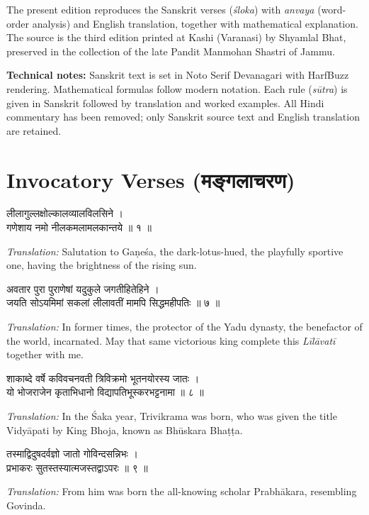 \documentclass[10pt,a4paper]{article}
\newenvironment{sanskritverse}{%
  \begin{center}%
  \begin{minipage}{0.94\textwidth}%
  \centering\devanagarifont\small%
}{%
  \end{minipage}%
  \end{center}%
  \vspace{0.1em}%
}
\begin{document}
The present edition reproduces the Sanskrit verses (\textit{śloka}) with \textit{anvaya} (word-order analysis) and English translation, together with mathematical explanation. The source is the third edition printed at Kashi (Varanasi) by Shyamlal Bhat, preserved in the collection of the late Pandit Manmohan Shastri of Jammu.

\textbf{Technical notes:} Sanskrit text is set in Noto Serif Devanagari with HarfBuzz rendering. Mathematical formulas follow modern notation. Each rule (\textit{sūtra}) is given in Sanskrit followed by translation and worked examples. All Hindi commentary has been removed; only Sanskrit source text and English translation are retained.

\section*{Invocatory Verses (मङ्गलाचरण)}

\begin{sanskritverse}
लीलागुल्लक्षोल्कालव्यालविलसिने ।\\
गणेशाय नमो नीलकमलामलकान्तये ॥ १ ॥
\end{sanskritverse}
\textit{Translation:} Salutation to Gaṇeśa, the dark-lotus-hued, the playfully sportive one, having the brightness of the rising sun.

\begin{sanskritverse}
अवतार पुरा पुराणेषां यदुकुले जगतीहितेहिने ।\\
जयति सोऽयमिमां सकलां लीलावतीं मामपि सिद्धमहीपतिः ॥ ७ ॥
\end{sanskritverse}
\textit{Translation:} In former times, the protector of the Yadu dynasty, the benefactor of the world, incarnated. May that same victorious king complete this \textit{Līlāvatī} together with me.

\begin{sanskritverse}
शाकाब्दे वर्षे कविवचनवती त्रिविक्रमो भूतनयोरस्य जातः ।\\
यो भोजराजेन कृताभिधानो विद्यापतिभूस्करभट्टनामा ॥ ८ ॥
\end{sanskritverse}
\textit{Translation:} In the Śaka year, Trivikrama was born, who was given the title Vidyāpati by King Bhoja, known as Bhūskara Bhaṭṭa.

\begin{sanskritverse}
तस्माद्विदुषदर्वज्ञो जातो गोविन्दसन्निभः ।\\
प्रभाकरः सुतस्तस्यात्मजस्तद्वाऽपरः ॥ ९ ॥
\end{sanskritverse}
\textit{Translation:} From him was born the all-knowing scholar Prabhākara, resembling Govinda.
\end{document}
